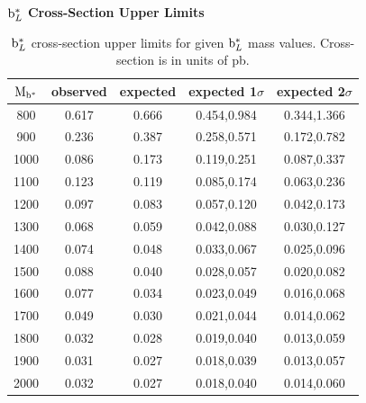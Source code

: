 \begin{table}[htcb]
\begin{center}
\bf{$\mathrm{b}^{*}_{L}$ Cross-Section Upper Limits}\\
\begin{tabular}{c||c|c|c|c}
\hline\hline
\bf{$\mathrm{M_{\mathrm{b}^{*}}}$} & \bf{observed}  & \bf{expected} & \bf{expected 1$\sigma$}  & \bf{expected 2$\sigma$} \\
\hline
\hline
800 & 0.617 & 0.666 & 0.454,0.984 & 0.344,1.366\\ 
900 & 0.236 & 0.387 & 0.258,0.571 & 0.172,0.782\\ 
1000 & 0.086 & 0.173 & 0.119,0.251 & 0.087,0.337\\ 
1100 & 0.123 & 0.119 & 0.085,0.174 & 0.063,0.236\\ 
1200 & 0.097 & 0.083 & 0.057,0.120 & 0.042,0.173\\ 
1300 & 0.068 & 0.059 & 0.042,0.088 & 0.030,0.127\\ 
1400 & 0.074 & 0.048 & 0.033,0.067 & 0.025,0.096\\ 
1500 & 0.088 & 0.040 & 0.028,0.057 & 0.020,0.082\\
1600 & 0.077 & 0.034 & 0.023,0.049 & 0.016,0.068\\ 
1700 & 0.049 & 0.030 & 0.021,0.044 & 0.014,0.062\\ 
1800 & 0.032 & 0.028 & 0.019,0.040 & 0.013,0.059\\ 
1900 & 0.031 & 0.027 & 0.018,0.039 & 0.013,0.057\\ 
2000 & 0.032 & 0.027 & 0.018,0.040 & 0.014,0.060\\ 
\hline
\end{tabular}
\end{center}
\caption{$\mathrm{b}^{*}_L$ cross-section upper limits for given $\mathrm{b}^{*}_L$ mass values.  Cross-section is in units of pb.}
\label{table:bsupperxsecL}
\end{table}



